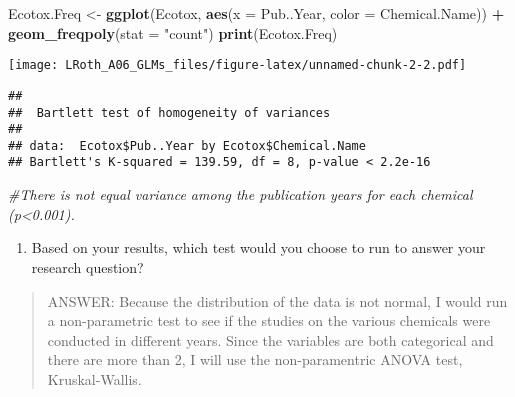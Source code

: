 \documentclass[]{article}
\newenvironment{Shaded}{\begin{snugshade}}{\end{snugshade}}
\newcommand{\KeywordTok}[1]{\textcolor[rgb]{0.13,0.29,0.53}{\textbf{#1}}}
\newcommand{\DataTypeTok}[1]{\textcolor[rgb]{0.13,0.29,0.53}{#1}}
\newcommand{\StringTok}[1]{\textcolor[rgb]{0.31,0.60,0.02}{#1}}
\newcommand{\CommentTok}[1]{\textcolor[rgb]{0.56,0.35,0.01}{\textit{#1}}}
\newcommand{\OperatorTok}[1]{\textcolor[rgb]{0.81,0.36,0.00}{\textbf{#1}}}
\newcommand{\NormalTok}[1]{#1}
\providecommand{\tightlist}{%
  \setlength{\itemsep}{0pt}\setlength{\parskip}{0pt}}
\begin{document}
\begin{Shaded}
\begin{Highlighting}[]
\NormalTok{Ecotox.Freq <-}\StringTok{ }\KeywordTok{ggplot}\NormalTok{(Ecotox, }\KeywordTok{aes}\NormalTok{(}\DataTypeTok{x =}\NormalTok{ Pub..Year, }\DataTypeTok{color =}\NormalTok{ Chemical.Name)) }\OperatorTok{+}
\StringTok{  }\KeywordTok{geom_freqpoly}\NormalTok{(}\DataTypeTok{stat =} \StringTok{"count"}\NormalTok{)}
\KeywordTok{print}\NormalTok{(Ecotox.Freq)}
\end{Highlighting}
\end{Shaded}

\texttt{[image: LRoth\_A06\_GLMs\_files/figure-latex/unnamed-chunk-2-2.pdf]}

\begin{Shaded}
\end{Shaded}

\begin{verbatim}
## 
##  Bartlett test of homogeneity of variances
## 
## data:  Ecotox$Pub..Year by Ecotox$Chemical.Name
## Bartlett's K-squared = 139.59, df = 8, p-value < 2.2e-16
\end{verbatim}

\begin{Shaded}
\begin{Highlighting}[]
\CommentTok{#There is not equal variance among the publication years for each chemical (p<0.001).}
\end{Highlighting}
\end{Shaded}

\begin{enumerate}
\def\labelenumi{\arabic{enumi}.}
\setcounter{enumi}{5}
\tightlist
\item
  Based on your results, which test would you choose to run to answer
  your research question?
\end{enumerate}

\begin{quote}
ANSWER: Because the distribution of the data is not normal, I would run
a non-parametric test to see if the studies on the various chemicals
were conducted in different years. Since the variables are both
categorical and there are more than 2, I will use the non-paramentric
ANOVA test, Kruskal-Wallis.
\end{quote}
\end{document}
